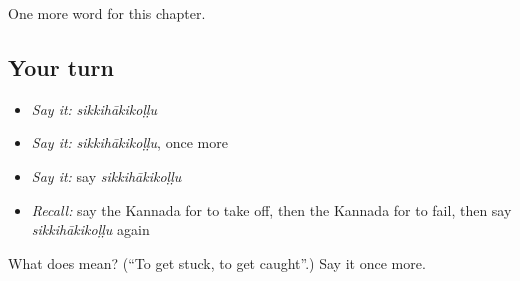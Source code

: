 \begin{grammarlens}[title={What you've built}]
One more word for this chapter.
\end{grammarlens}

\subsection*{Your turn}
\begin{itemize}
\raggedright
  \item \emph{Say it:} \emph{sikkihākikoḷḷu}
  \item \emph{Say it:} \emph{sikkihākikoḷḷu}, once more
  \item \emph{Say it:} say \emph{sikkihākikoḷḷu}
  \item \emph{Recall:} say the Kannada for to take off, then the Kannada for to fail, then say \emph{sikkihākikoḷḷu} again
\end{itemize}

\begin{tcolorbox}[breakable,colback=teal!4,colframe=teal!35!black,title={Before you move on}]
What does  mean? (\textquotedblleft{}To get stuck, to get caught\textquotedblright{}.) Say it once more.
\end{tcolorbox}
